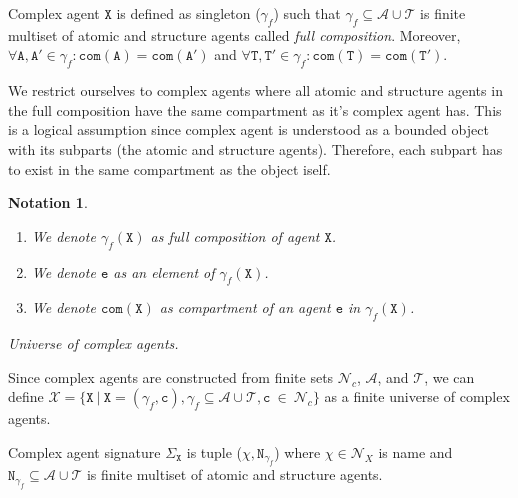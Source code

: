 \documentclass{elsarticle}
\newtheorem{notation}{Notation}
\begin{document}
\begin{definition}
Complex agent $\mathtt{X}$ is defined as singleton ($\gamma_f$) such that $\gamma_f \subseteq \mathcal{A} \cup \mathcal{T}$ is finite multiset of atomic and structure agents called \emph{full composition}. Moreover, $\forall \mathtt{A}, \mathtt{A}' \in \gamma_f: \mathtt{com}(\mathtt{A}) = \mathtt{com}(\mathtt{A}')$ and $\forall \mathtt{T}, \mathtt{T}' \in \gamma_f: \mathtt{com}(\mathtt{T}) = \mathtt{com}(\mathtt{T}')$.
\end{definition}

We restrict ourselves to complex agents where all atomic and structure agents in the full composition have the same compartment as it's complex agent has. This is a logical assumption since complex agent is understood as a bounded object with its subparts (the atomic and structure agents). Therefore, each subpart has to exist in the same compartment as the object iself.

\begin{notation}
~

\begin{enumerate}
\item We denote $\gamma_f(\mathtt{X})$ as full composition of agent $\mathtt{X}$.
\item We denote $\mathtt{e}$ as an element of $\gamma_f(\mathtt{X})$.
\item We denote $\mathtt{com}(\mathtt{X})$ as compartment of an agent $\mathtt{e}$ in $\gamma_f(\mathtt{X})$.
\end{enumerate}
\end{notation}

\begin{definition}
\textit{Universe of complex agents.}  

\noindent Since complex agents are constructed from finite sets $\mathcal{N}_{c}$, $\mathcal{A}$, and $\mathcal{T}$, we can define $\mathcal{X} = \{ \mathtt{X}~|~\mathtt{X} = (\gamma_f, \mathtt{c}), \gamma_f \subseteq \mathcal{A} \cup \mathcal{T},  \mathtt{c}~\in~\mathcal{N}_{c} \}$ as a finite universe of complex agents.
\end{definition}

\begin{definition}
Complex agent signature $\Sigma_\mathtt{X}$ is tuple ($\chi, \mathtt{N}_{\gamma_f}$) where $\chi \in \mathcal{N}_{X}$ is name and $\mathtt{N}_{\gamma_f} \subseteq \mathcal{A} \cup \mathcal{T}$ is finite multiset of atomic and structure agents.
\end{definition}
\end{document}
